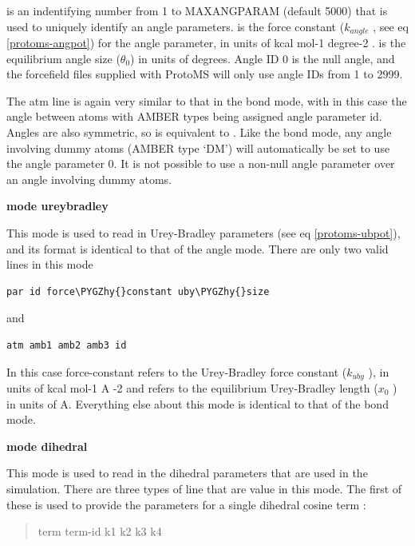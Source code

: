 \documentclass[letterpaper,10pt,english]{sphinxmanual}
\def\PYGZhy{\char`\-}
\begin{document}
 is an indentifying number from 1 to MAXANGPARAM (default 5000) that is used to uniquely identify an angle parameters.  is the force constant (\(k_{angle}\) , see eq \eqref{protoms-angpot}) for the angle parameter, in units of kcal mol-1 degree-2 .  is the equilibrium angle size (\(\theta_0\)) in units of degrees. Angle ID 0 is the null angle, and the forcefield files supplied with ProtoMS will only use angle IDs from 1 to 2999.

The atm line is again very similar to that in the bond mode, with in this case the angle between atoms with AMBER types  being assigned angle parameter id. Angles are also symmetric, so  is equivalent to . Like the bond mode, any angle involving dummy atoms (AMBER type ‘DM’) will automatically be set to use the angle parameter 0. It is not possible to use a non-null angle parameter over an angle involving dummy atoms.

\textbf{mode ureybradley}

This mode is used to read in Urey-Bradley parameters (see eq \eqref{protoms-ubpot}), and its format is identical to that of the angle mode. There are only two valid lines in this mode

\begin{Verbatim}[commandchars=\\\{\}]
par id force\PYGZhy{}constant uby\PYGZhy{}size
\end{Verbatim}

and

\begin{Verbatim}[commandchars=\\\{\}]
atm amb1 amb2 amb3 id
\end{Verbatim}

In this case force-constant refers to the Urey-Bradley force constant (\(k_{uby}\) ), in units of kcal mol-1 A -2 and  refers to the equilibrium Urey-Bradley length (\(x_0\) ) in units of A. Everything else about this mode is identical to that of the bond mode.

\textbf{mode dihedral}

This mode is used to read in the dihedral parameters that are used in the simulation. There are three types of line that are value in this mode. The first of these is used to provide the parameters for a single dihedral cosine term :
\begin{quote}

term term-id k1 k2 k3 k4
\end{quote}
\end{document}
